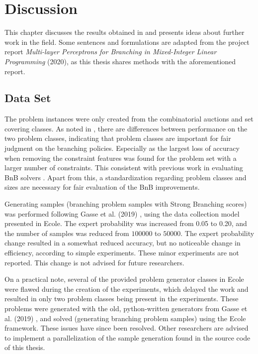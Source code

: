 \chapter{Discussion}\label{cha:discussion}

This chapter discusses the results obtained in  and presents ideas about further work in the field. Some sentences and formulations are adapted from the project report \textit{Multi-layer Perceptrons for Branching in Mixed-Integer Linear Programming} (2020), as this thesis shares methods with the aforementioned report. 
 

\section{Data Set}\label{sec:dis_data}

The problem instances were only created from the combinatorial auctions and set covering classes. As noted in , there are differences between performance on the two problem classes, indicating that problem classes are important for fair judgment on the branching policies. Especially as the largest loss of accuracy when removing the constraint features was found for the problem set with a larger number of constraints. This consistent with previous work in evaluating \gls{BnB} solvers \cite{anand2017comparative}. Apart from this, a standardization regarding problem classes and sizes are necessary for fair evaluation of the \gls{BnB} improvements.

Generating samples (branching problem samples with Strong Branching scores) was performed following Gasse et al. (2019) \cite{gasse2019exact}, using the data collection model presented in \gls{Ecole}. The expert probability was increased from 0.05 to 0.20, and the number of samples was reduced from $100000$ to $50000$. The expert probability change resulted in a somewhat reduced accuracy, but no noticeable change in efficiency, according to simple experiments. These minor experiments are not reported. This change is not advised for future researchers.    

On a practical note, several of the provided problem generator classes in \gls{Ecole} were flawed during the creation of the experiments, which delayed the work and resulted in only two problem classes being present in the experiments. These problems were generated with the old, python-written generators from Gasse et al. (2019) \cite{gasse2019exact}, and solved (generating branching problem samples) using the \gls{Ecole} framework. These issues have since been resolved. Other researchers are advised to implement a parallelization of the sample generation found in the source code of this thesis. 

